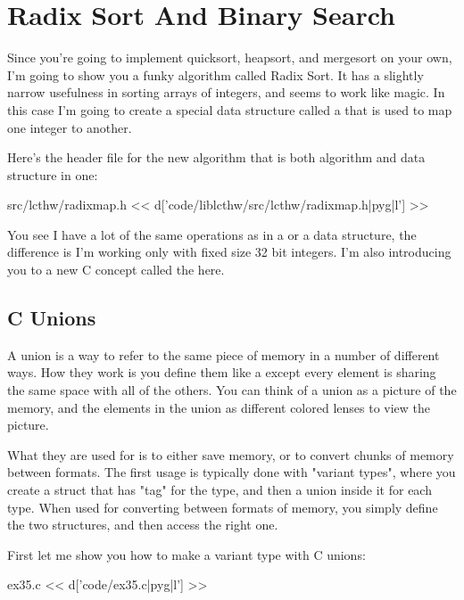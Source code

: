 \section{Radix Sort And Binary Search}

Since you're going to implement quicksort, heapsort, and mergesort on your own,
I'm going to show you a funky algorithm called Radix Sort.  It has a
slightly narrow usefulness in sorting arrays of integers, and seems to
work like magic.  In this case I'm going to create a special data 
structure called a  that is used to map one integer
to another.

Here's the header file for the new algorithm that is both algorithm
and data structure in one:

\begin{code}{src/lcthw/radixmap.h}
<< d['code/liblcthw/src/lcthw/radixmap.h|pyg|l'] >>
\end{code}

You see I have a lot of the same operations as in a  or
a  data structure, the difference is I'm working only with
fixed size 32 bit  integers.  I'm also introducing you to
a new C concept called the  here.

\subsection{C Unions}

A union is a way to refer to the same piece of memory in a number of different
ways.  How they work is you define them like a  except every
element is sharing the same space with all of the others.  You can think
of a union as a picture of the memory, and the elements in the union as 
different colored lenses to view the picture.

What they are used for is to either save memory, or to convert chunks of memory
between formats.  The first usage is typically done with "variant types", where
you create a struct that has "tag" for the type, and then a union inside it
for each type.  When used for converting between formats of memory, you simply
define the two structures, and then access the right one.

First let me show you how to make a variant type with C unions:

\begin{code}{ex35.c}
<< d['code/ex35.c|pyg|l'] >>
\end{code}

